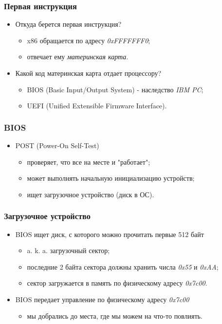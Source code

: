 \begin{frame}
\frametitle{Первая инструкция}
\begin{itemize}
    \item<1->Откуда берется первая инструкция?
    \begin{itemize}
        \item<2->x86 обращается по адресу \emph{0xFFFFFFF0};
        \item<3->отвечает ему \emph{материнская карта}.
    \end{itemize}
    \item<4->Какой код материнская карта отдает процессору?
    \begin{itemize}
        \item BIOS (Basic Input/Output System) - наследство \emph{IBM PC};
        \item UEFI (Unified Extensible Firmware Interface).
    \end{itemize}
\end{itemize}
\end{frame}

\begin{frame}
\frametitle{BIOS}
\begin{itemize}
    \item<1-> POST (Power-On Self-Test)
    \begin{itemize}
        \item<1-> проверяет, что все на месте и "работает";
        \item<1-> может выполнять начальную инициализацию устройств;
        \item<2-> ищет загрузочное устройство (диск в ОС).
    \end{itemize}
\end{itemize}
\end{frame}

\begin{frame}
\frametitle{Загрузочное устройство}
\begin{itemize}
    \item<1->BIOS ищет диск, с которого можно прочитать первые 512 байт
    \begin{itemize}
        \item<1->a. k. a. загрузочный сектор;
        \item<2->последние 2 байта сектора должны хранить числа \emph{0x55}
        и \emph{0xAA};
        \item<3->сектор загружается в память по физическому адресу
        \emph{0x7c00}.
    \end{itemize}
    \item<4->BIOS передает управление по физическому адресу \emph{0x7c00}
    \begin{itemize}
        \item мы добрались до места, где мы можем на что-то повлиять.
    \end{itemize}
\end{itemize}
\end{frame}

